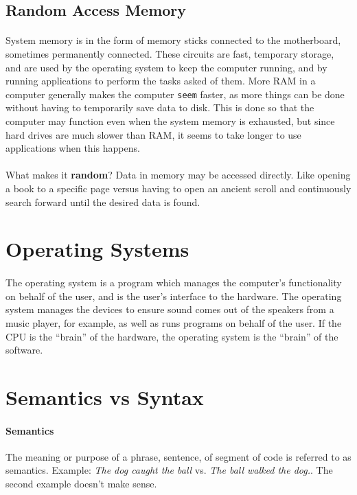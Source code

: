 \documentclass[letter,10pt]{article}
\begin{document}
\subsection{Random Access Memory}\label{sec:ram}
\paragraph{}System memory is in the form of memory sticks connected to the motherboard, sometimes permanently connected. These circuits are fast, temporary storage, and are used by the operating system to keep the computer running, and by running applications to perform the tasks asked of them. More RAM in a computer generally makes the computer \texttt{seem} faster, as more things can be done without having to temporarily save data to disk. This is done so that the computer may function even when the system memory is exhausted, but since hard drives are much slower than RAM, it seems to take longer to use applications when this happens.

\paragraph{}What makes it \textbf{random}? Data in memory may be accessed directly. Like opening a book to a specific page versus having to open an ancient scroll and continuously search forward until the desired data is found.

\section{Operating Systems}
\paragraph{}The operating system is a program which manages the computer's functionality on behalf of the user, and is the user's interface to the hardware. The operating system manages the devices to ensure sound comes out of the speakers from a music player, for example, as well as runs programs on behalf of the user. If the CPU is the ``brain'' of the hardware, the operating system is the ``brain'' of the software.

\section{Semantics vs Syntax}
\paragraph{Semantics} The meaning or purpose of a phrase, sentence, of segment of code is referred to as semantics. Example: \textit{The dog caught the ball} vs. \textit{The ball walked the dog.}. The second example doesn't make sense.
\end{document}
